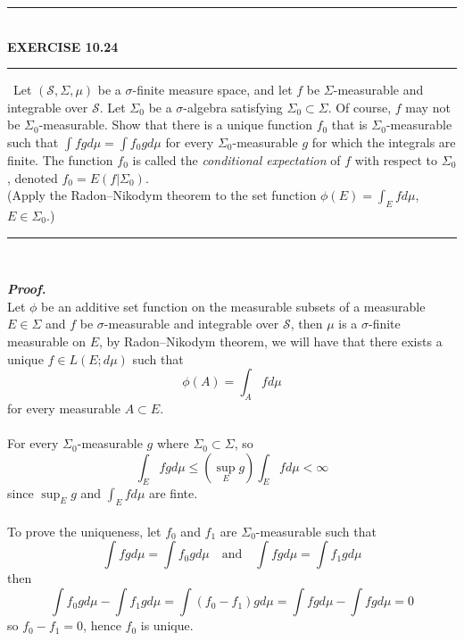 \documentclass[a4paper,11pt]{article}
\begin{document}
	\begin{flushleft}
		\rule[-0.5ex]{17cm}{2pt}\\
			\textbf{EXERCISE 10.24}\\
		\rule[1.5ex]{17cm}{0.5pt}\
		Let $(\mathscr{S}, \Sigma, \mu)$ be a $\sigma$-finite measure space, and let $f$ be $\Sigma$-measurable and integrable over $\mathscr{S}$. Let $\Sigma_0$ be a $\sigma$-algebra satisfying $\Sigma_0 \subset \Sigma$. Of course, $f$ may not be $\Sigma_0$-measurable. Show that there is a unique function $f_0$ that is $\Sigma_0$-measurable such that $\int fg d\mu = \int f_0 g d\mu$ for every $\Sigma_0$-measurable $g$ for which the integrals are finite. The function $f_0$ is called the \textit{conditional expectation} of $f$ with respect to $\Sigma_0$, denoted $f_0 = E(f|\Sigma_0)$.
		\\(Apply the Radon–Nikodym theorem to the set function $\phi(E) = \int_E f d\mu$, $E \in \Sigma_0$.)\\
	\rule[1.0ex]{17cm}{0.5pt}\
	\end{flushleft}
	\textit{\textbf {Proof.}}\\
	Let $\phi$ be an additive set function on the measurable subsets of a measurable $E \in \Sigma$ and $f$ be $\sigma$-measurable and integrable over $\mathscr{S}$, then $\mu$ is a $\sigma$-finite measurable on $E$, by Radon–Nikodym theorem, we will have that there exists a unique $f \in L(E;d\mu)$ such that
		$$\phi(A) = \int_A f d\mu$$
	for every measurable $A \subset E$.\\\\
	For every $\Sigma_0$-measurable $g$ where $\Sigma_0 \subset \Sigma$, so
		$$\int_E fg d\mu \leq (\sup_{E} g) \int_E f d\mu < \infty$$
	since $\sup_{E} g$ and $\int_E f d\mu$ are finte.\\\\
	To prove the uniqueness, let $f_0$ and $f_1$ are $\Sigma_0$-measurable such that
		$$\int fg d\mu = \int f_0g d\mu
		\quad \text{and} \quad
		\int fg d\mu = \int f_1 g d\mu$$
	then
		$$\int f_0g d\mu - \int f_1 g d\mu
		= \int (f_0 - f_1) g d\mu
		= \int fg d\mu - \int fg d\mu
		= 0$$
	so $f_0 - f_1 = 0$, hence $f_0$ is unique.\\
\end{document}

